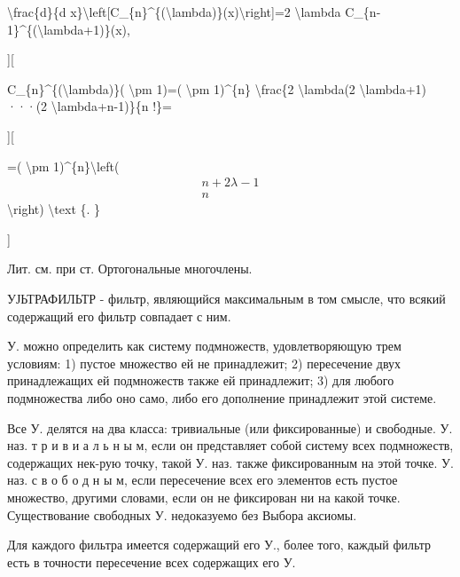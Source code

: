 \documentclass[10pt]{article}
\begin{document}
\textbackslash frac\{d\}\{d x\}\textbackslash left[C\_\{n\}\^{}\{(\textbackslash lambda)\}(x)\textbackslash right]=2 \textbackslash lambda C\_\{n-1\}\^{}\{(\textbackslash lambda+1)\}(x),



][



C\_\{n\}\^{}\{(\textbackslash lambda)\}( \textbackslash pm 1)=( \textbackslash pm 1)\^{}\{n\} \textbackslash frac\{2 \textbackslash lambda(2 \textbackslash lambda+1) ···(2 \textbackslash lambda+n-1)\}\{n !\}=



][



=( \textbackslash pm 1)\^{}\{n\}\textbackslash left(\[

\begin{array}{c}

n+2 \lambda-1 \\

n

\end{array}

\]\textbackslash right) \textbackslash text \{. \}

]



Лит. см. при ст. Ортогональные многочлены.



УЈЬТРАФИЛЬТР - фильтр, являющийся максимальным в том смысле, что всякий содержащий его фильтр совпадает с ним.



У. можно определить как систему подмножеств, удовлетворяющую трем условиям: 1) пустое множество ей не принадлежит; 2) пересечение двух принадлежащих ей подмножеств также ей принадлежит; 3) для любого подмножества либо оно само, либо его дополнение принадлежит этой системе.



Все У. делятся на два класса: тривиальные (или фиксированные) и свободные. У. наз. т р и в и а л ь н ы м, если он представляет собой систему всех подмножеств, содержащих нек-рую точку, такой У. наз. также фиксированным на этой точке. У. наз. с в о б о д н ы м, если пересечение всех его элементов есть пустое множество, другими словами, если он не фиксирован ни на какой точке. Существование свободных У. недоказуемо без Выбора аксиомы.



Для каждого фильтра имеется содержащий его У., более того, каждый фильтр есть в точности пересечение всех содержащих его У.
\end{document}
